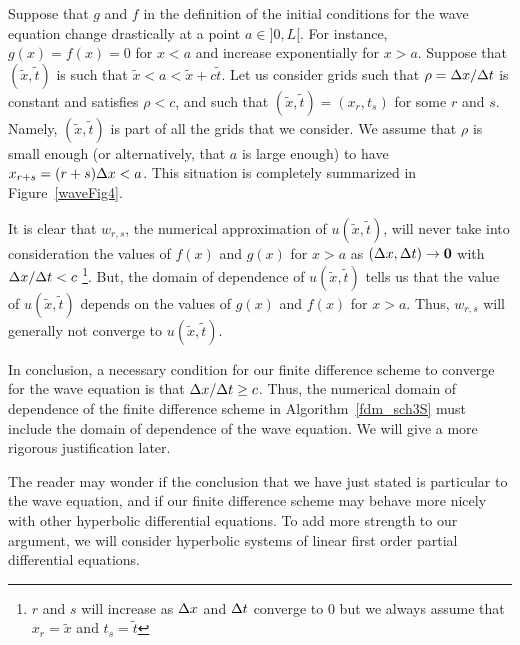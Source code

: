 
Suppose that $g$ and $f$ in the definition of the initial conditions
for the wave equation change drastically at a point $a \in ]0, L[$.
For instance, $g(x) = f(x) = 0$ for $x < a$ and increase exponentially
for $x>a$.  Suppose that $(\tilde{x},\tilde{t})$ is such that
$\tilde{x} < a < \tilde{x} + c \tilde{t}$.  Let us consider
grids such that $\rho = \Delta{x}/\Delta{t}$ is constant and satisfies
$\rho < c$, and such that $(\tilde{x},\tilde{t}) = (x_r,t_s)$ for some
$r$ and $s$.  Namely, $(\tilde{x},\tilde{t})$ is part of all the grids
that we consider.  We assume that $\rho$ is small enough (or
alternatively, that $a$ is large enough) to have
$x_{r+s} = (r+s)\Delta{x} < a$.   This situation is completely summarized in
Figure~\ref{waveFig4}.


It is clear that $w_{r,s}$, the numerical approximation of
$u(\tilde{x},\tilde{t})$, will never take into consideration the
values of $f(x)$ and $g(x)$ for $x>a$ as $(\Delta{x},\Delta{t}) \to \mathbf{0}$
with $\Delta{x}/\Delta{t} < c$ \footnote{$r$ and
$s$ will increase as $\Delta{x}$ and $\Delta{t}$ converge to $0$ but we
always assume that $x_r = \tilde{x}$ and $t_s = \tilde{t}$}.  But,
the domain of dependence of $u(\tilde{x},\tilde{t})$ tells us that the
value of $u(\tilde{x},\tilde{t})$ depends on the values of $g(x)$ and
$f(x)$ for $x>a$.  Thus, $w_{r,s}$ will generally not converge
to $u(\tilde{x},\tilde{t})$.

In conclusion, a necessary condition for our finite difference scheme
to converge for the wave equation is that $\Delta{x}/\Delta{t} \geq c$.
Thus, the numerical domain of dependence of the finite difference
scheme in Algorithm~\ref{fdm_sch3S} must include the domain of
dependence of the wave equation.  We will give a more rigorous
justification later.

The reader may wonder if the conclusion that we have just stated is
particular to the wave equation, and if our finite difference scheme
may behave more nicely with other hyperbolic differential equations.
To add more strength to our argument, we will consider hyperbolic
systems of linear first order partial differential equations.

